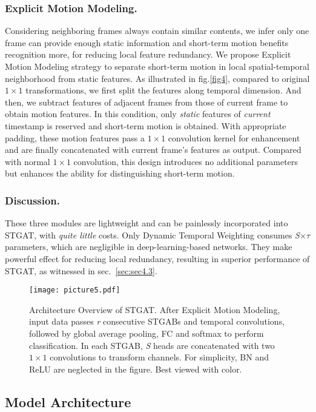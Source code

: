 \documentclass[runningheads]{llncs}
\begin{document}
\subsubsection{Explicit Motion Modeling.}
Considering neighboring frames always contain similar contents, we infer only one frame can provide enough static information and short-term motion benefits recognition more, for reducing local feature redundancy. We propose Explicit Motion Modeling strategy to separate short-term motion in local spatial-temporal neighborhood from static features. As illustrated in fig.\ref{fig4}, compared to original $1\times 1$ transformations, we first split the features along temporal dimension. And then, we subtract features of adjacent frames from those of current frame to obtain motion features. In this condition, only \textit{static} features of \textit{current} timestamp is reserved and short-term motion is obtained. With appropriate padding, these motion features pass a $1\times 1$ convolution kernel for enhancement and are finally concatenated with current frame's features as output. Compared with normal $1\times 1$ convolution, this design introduces no additional parameters but enhances the ability for distinguishing short-term motion.
 
\vspace{-10px}
\subsubsection{Discussion.}
These three modules are lightweight and can be painlessly incorporated into STGAT, with \textit{quite little} costs. Only Dynamic Temporal Weighting consumes \textit{S}$\times\tau$ parameters, which are negligible in deep-learning-based networks. They make powerful effect for reducing local redundancy, resulting in superior performance of STGAT, as witnessed in sec.~\ref{sec:sec4.3}.
\begin{figure}[t]
\centering
\texttt{[image: picture5.pdf]} \caption{Architecture Overview of STGAT. After Explicit Motion Modeling, input data passes \textit{r} consecutive STGABs and temporal convolutions, followed by global average pooling, FC and softmax to perform classification. In each STGAB, \textit{S} heads are concatenated with two $1\times 1 $ convolutions to transform channels. For simplicity, BN and ReLU are neglected in the figure. Best viewed with color.}
\label{fig5}
\end{figure}
\subsection{Model Architecture}
\end{document}
